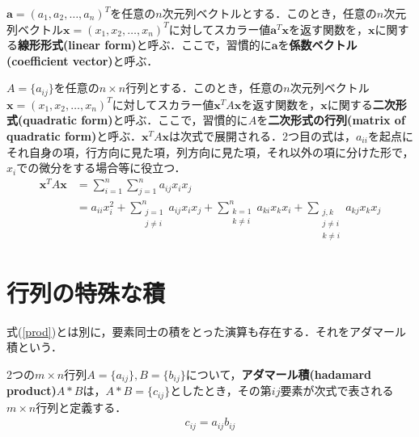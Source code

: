\begin{defi}[線形形式]
${\bm a}=(a_1,a_2,\ldots,a_n)^T$を任意の$n$次元列ベクトルとする．このとき，任意の$n$次元列ベクトル${\bm x}=(x_1,x_2,\ldots,x_n)^T$に対してスカラー値${\bm a}^T{\bm x}$を返す関数を，${\bm x}$に関する{\bf 線形形式(linear form)}と呼ぶ．ここで，習慣的に${\bm a}$を{\bf 係数ベクトル(coefficient vector)}と呼ぶ．
\end{defi}

\begin{defi}[二次形式]
$A=\{a_{ij}\}$を任意の$n\times n$行列とする．このとき，任意の$n$次元列ベクトル${\bm x}=(x_1,x_2,\ldots,x_n)^T$に対してスカラー値${\bm x}^TA{\bm x}$を返す関数を，${\bm x}$に関する{\bf 二次形式(quadratic form)}と呼ぶ．ここで，習慣的に$A$を{\bf 二次形式の行列(matrix of quadratic form)}と呼ぶ．${\bm x}^TA{\bm x}$は次式で展開される．2つ目の式は，$a_{ii}$を起点にそれ自身の項，行方向に見た項，列方向に見た項，それ以外の項に分けた形で，$x_i$での微分をする場合等に役立つ．
\begin{align}
{\bm x}^TA{\bm x}&= \sum_{i=1}^n\sum_{j=1}^n a_{ij}x_ix_j\\
&=a_{ii}x_i^2+\sum_{\substack{j=1\\j\neq i}}^n a_{ij}x_ix_j+\sum_{\substack{k=1\\k\neq i}}^n a_{ki}x_kx_i+\sum_{\substack{j,k\\j\neq i\\k\neq i}}a_{kj}x_kx_j \label{quadform}
\end{align}
\end{defi}

\section{行列の特殊な積}

式(\ref{prod})とは別に，要素同士の積をとった演算も存在する．それをアダマール積という．

\begin{defi}[アダマール積]
2つの$m\times n$行列$A=\{a_{ij}\}, B=\{b_{ij}\}$について，{\bf アダマール積(hadamard product)}$A*B$は，$A*B=\{c_{ij}\}$としたとき，その第$ij$要素が次式で表される$m\times n$行列と定義する．
\begin{align}
c_{ij}=a_{ij}b_{ij}
\end{align}
\end{defi}

